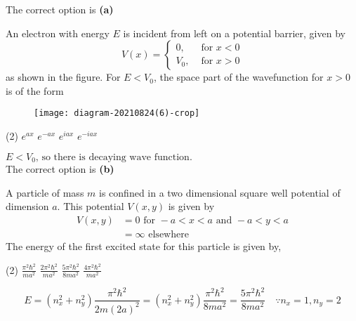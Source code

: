 \begin{enumerate}
\begin{answer}
		The correct option is \textbf{(a)}	
	\end{answer}
	\begin{minipage}{\textwidth}
		\item An electron with energy $E$ is incident from left on a potential barrier, given by
		$$
		V(x)= \begin{cases}0, & \text { for } x<0 \\ V_{0}, & \text { for } x>0\end{cases}
		$$
		as shown in the figure. For $E<V_{0}$, the space part of the wavefunction for $x>0$ is of the form
		\begin{figure}[H]
			\centering
			\texttt{[image: diagram-20210824(6)-crop]}
		\end{figure}
	\end{minipage}
	\begin{tasks}(2)
		\task[\textbf{A.}] $e^{a x}$
		\task[\textbf{B.}] $e^{-a x}$
		\task[\textbf{C.}] $e^{i a x}$
		\task[\textbf{D.}]$e^{-i a x}$
	\end{tasks}
	\begin{answer}
		$E<V_{0} \text {, so there is decaying wave function. }	$\\
		The correct option is \textbf{(b)}
	\end{answer}
	\begin{minipage}{\textwidth}
		\item A particle of mass $m$ is confined in a two dimensional square well potential of dimension $a$. This potential $V(x, y)$ is given by
		$$
		\begin{aligned}
		V(x, y) &=0 \text { for }-a<x<a \text { and }-a<y<a \\
		&=\infty \text { elsewhere }
		\end{aligned}
		$$
		The energy of the first excited state for this particle is given by,
	\end{minipage}
	\begin{tasks}(2)
		\task[\textbf{A.}]$\frac{\pi^{2} \hbar^{2}}{m a^{2}}$
		\task[\textbf{B.}] $\frac{2 \pi^{2} \hbar^{2}}{m a^{2}}$
		\task[\textbf{C.}]$\frac{5 \pi^{2} \hbar^{2}}{8 m a^{2}}$
		\task[\textbf{D.}] $\frac{4 \pi^{2} \hbar^{2}}{m a^{2}}$
	\end{tasks}
	\begin{answer}
		$$E=\left(n_{x}^{2}+n_{y}^{2}\right) \frac{\pi^{2} \hbar^{2}}{2 m(2 a)^{2}}=\left(n_{x}^{2}+n_{y}^{2}\right) \frac{\pi^{2} \hbar^{2}}{8 m a^{2}}=\frac{5 \pi^{2} \hbar^{2}}{8 m a^{2}} \quad \because n_{x}=1, n_{y}=2$$

\end{answer}
\end{enumerate}
